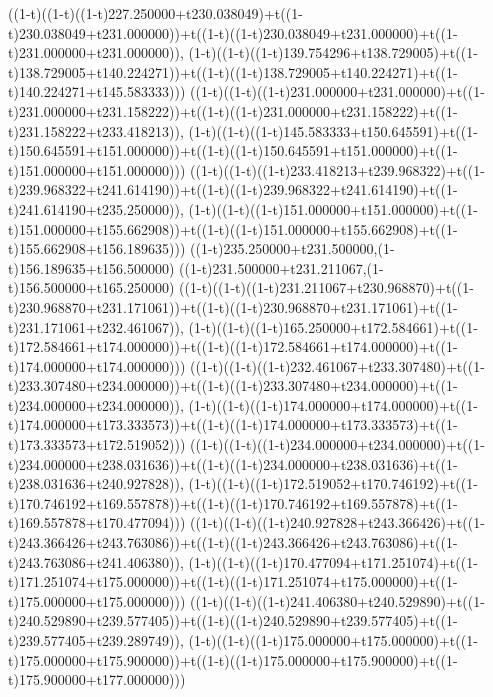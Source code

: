 ((1-t)((1-t)((1-t)227.250000+t230.038049)+t((1-t)230.038049+t231.000000))+t((1-t)((1-t)230.038049+t231.000000)+t((1-t)231.000000+t231.000000)),                                     (1-t)((1-t)((1-t)139.754296+t138.729005)+t((1-t)138.729005+t140.224271))+t((1-t)((1-t)138.729005+t140.224271)+t((1-t)140.224271+t145.583333)))
((1-t)((1-t)((1-t)231.000000+t231.000000)+t((1-t)231.000000+t231.158222))+t((1-t)((1-t)231.000000+t231.158222)+t((1-t)231.158222+t233.418213)),                                     (1-t)((1-t)((1-t)145.583333+t150.645591)+t((1-t)150.645591+t151.000000))+t((1-t)((1-t)150.645591+t151.000000)+t((1-t)151.000000+t151.000000)))
((1-t)((1-t)((1-t)233.418213+t239.968322)+t((1-t)239.968322+t241.614190))+t((1-t)((1-t)239.968322+t241.614190)+t((1-t)241.614190+t235.250000)),                                     (1-t)((1-t)((1-t)151.000000+t151.000000)+t((1-t)151.000000+t155.662908))+t((1-t)((1-t)151.000000+t155.662908)+t((1-t)155.662908+t156.189635)))
((1-t)235.250000+t231.500000,(1-t)156.189635+t156.500000)
((1-t)231.500000+t231.211067,(1-t)156.500000+t165.250000)
((1-t)((1-t)((1-t)231.211067+t230.968870)+t((1-t)230.968870+t231.171061))+t((1-t)((1-t)230.968870+t231.171061)+t((1-t)231.171061+t232.461067)),                                     (1-t)((1-t)((1-t)165.250000+t172.584661)+t((1-t)172.584661+t174.000000))+t((1-t)((1-t)172.584661+t174.000000)+t((1-t)174.000000+t174.000000)))
((1-t)((1-t)((1-t)232.461067+t233.307480)+t((1-t)233.307480+t234.000000))+t((1-t)((1-t)233.307480+t234.000000)+t((1-t)234.000000+t234.000000)),                                     (1-t)((1-t)((1-t)174.000000+t174.000000)+t((1-t)174.000000+t173.333573))+t((1-t)((1-t)174.000000+t173.333573)+t((1-t)173.333573+t172.519052)))
((1-t)((1-t)((1-t)234.000000+t234.000000)+t((1-t)234.000000+t238.031636))+t((1-t)((1-t)234.000000+t238.031636)+t((1-t)238.031636+t240.927828)),                                     (1-t)((1-t)((1-t)172.519052+t170.746192)+t((1-t)170.746192+t169.557878))+t((1-t)((1-t)170.746192+t169.557878)+t((1-t)169.557878+t170.477094)))
((1-t)((1-t)((1-t)240.927828+t243.366426)+t((1-t)243.366426+t243.763086))+t((1-t)((1-t)243.366426+t243.763086)+t((1-t)243.763086+t241.406380)),                                     (1-t)((1-t)((1-t)170.477094+t171.251074)+t((1-t)171.251074+t175.000000))+t((1-t)((1-t)171.251074+t175.000000)+t((1-t)175.000000+t175.000000)))
((1-t)((1-t)((1-t)241.406380+t240.529890)+t((1-t)240.529890+t239.577405))+t((1-t)((1-t)240.529890+t239.577405)+t((1-t)239.577405+t239.289749)),                                     (1-t)((1-t)((1-t)175.000000+t175.000000)+t((1-t)175.000000+t175.900000))+t((1-t)((1-t)175.000000+t175.900000)+t((1-t)175.900000+t177.000000)))
